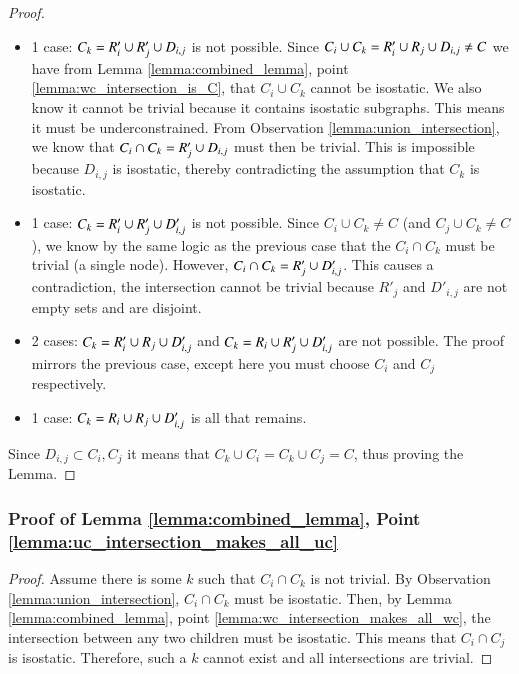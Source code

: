 \begin{proof}
\begin{itemize}
    \item 1 case: $C_k=R'_i\cup R'_j\cup D_{i,j}$ is not possible. Since $C_i\cup C_k = R'_i\cup R_j\cup D_{i,j}\neq C$ we have from Lemma \ref{lemma:combined_lemma}, point \ref{lemma:wc_intersection_is_C}, that $C_i\cup C_k$ cannot be isostatic. We also know it cannot be trivial because it contains isostatic subgraphs. This means it must be underconstrained. From Observation \ref{lemma:union_intersection}, we know that $C_i\cap C_k=R'_j\cup D_{i,j}$ must then be trivial. This is impossible because $D_{i,j}$ is isostatic, thereby contradicting the assumption that $C_k$ is isostatic.

    \item 1 case: \usestwod $C_k=R'_i\cup R'_j\cup D'_{i,j}$ is not possible. Since $C_i\cup C_k\neq C$ (and $C_j\cup C_k\neq C$), we know by the same logic as the previous case that the $C_i\cap C_k$ must be trivial (a single node). However, $C_i\cap C_k=R'_j\cup D'_{i,j}$. This causes a contradiction, the intersection cannot be trivial because $R'_j$ and $D'_{i,j}$ are not empty sets and are disjoint.

    \item 2 cases: \usestwod $C_k=R'_i\cup R_j\cup D'_{i,j}$ and $C_k=R_i\cup R'_j\cup D'_{i,j}$ are not possible. The proof mirrors the previous case, except here you must choose $C_i$ and $C_j$ respectively.

    \item 1 case: $C_k=R_i\cup R_j\cup D'_{i,j}$ is all that remains.
\end{itemize}

Since $D_{i,j}\subset C_i, C_j$ it means that $C_k\cup C_i = C_k \cup C_j = C$, thus proving the Lemma.
%
\end{proof}

\subsubsection{Proof of Lemma \ref{lemma:combined_lemma}, Point \ref{lemma:uc_intersection_makes_all_uc}}

\begin{proof}
Assume there is some $k$ such that $C_i\cap C_k$ is not trivial. By Observation \ref{lemma:union_intersection}, $C_i\cap C_k$ must be isostatic. Then, by Lemma \ref{lemma:combined_lemma}, point \ref{lemma:wc_intersection_makes_all_wc}, the intersection between any two children must be isostatic. This means that $C_i\cap C_j$ is isostatic. Therefore, such a $k$ cannot exist and all intersections are trivial.
\end{proof}


